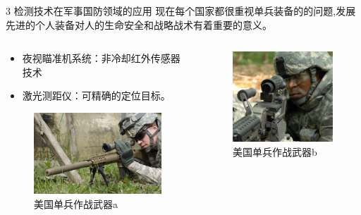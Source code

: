 \documentclass[10pt]{beamer}
\begin{document}
\begin{frame}{
3 检测技术在军事国防领域的应用}
现在每个国家都很重视单兵装备的的问题,发展先进的个人装备对人的生命安全和战略战术有着重要的意义。
    \begin{columns}
        \begin{column}{0.6\textwidth}
        
        \begin{itemize}
        \item 夜视瞄准机系统：非冷却红外传感器技术

        \item 激光测距仪：可精确的定位目标。
        \end{itemize}
             \begin{figure}[htbp] 
            \centering\includegraphics[width=2.5in]{source/intro5.jpg} \caption{美国单兵作战武器a}\label{fig:5} 
            \end{figure}
        \end{column}
        \begin{column}{0.4\textwidth}
        \begin{figure}[htbp] 
            \centering\includegraphics[width=2.0in]{source/intro6.jpg} \caption{美国单兵作战武器b}\label{fig:6} 
            \end{figure}
        
        \end{column}
        \end{columns}
\end{frame}
\end{document}

